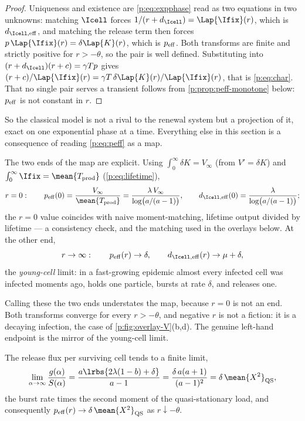 \begin{proof}
Uniqueness and existence are \cref{p:eq:expphase} read as two equations in
two unknowns: matching $\Icell$ forces
$1/(r+d_{\Icell})=\Lap{\Ifix}(r)$, which is $d_{\Icell,{\rm eff}}$, and
matching the release term then forces
$p\,\Lap{\Ifix}(r)=\delta\Lap{K}(r)$, which is $p_{\rm eff}$. Both
transforms are finite and strictly positive for $r>-\theta$, so the pair is
well defined. Substituting into $(r+d_{\Icell})(r+c)=\gamma Tp$ gives
$(r+c)/\Lap{\Ifix}(r)=\gamma T\,\delta\Lap{K}(r)/\Lap{\Ifix}(r)$, that is
\cref{p:eq:char}. That no single pair serves a transient follows from
\cref{p:prop:peff-monotone} below: $p_{\rm eff}$ is not constant in $r$.
\end{proof}

\noindent
So the classical model is not a rival to the renewal system but a projection
of it, exact on one exponential phase at a time. Everything else in this
section is a consequence of reading \cref{p:eq:peff} as a map.

The two ends of the map are explicit. Using $\int_0^\infty\delta K=V_\infty$ (from $V'=\delta K$) and
$\int_0^\infty\Ifix=\mean{T_{\rm prod}}$ (\cref{p:eq:lifetime}),
\begin{equation}
r=0:\qquad
p_{\rm eff}(0)=\frac{V_\infty}{\mean{T_{\rm prod}}}
=\frac{\lambda\,V_\infty}{\log\bigl(a/(a-1)\bigr)},
\qquad
d_{\Icell,{\rm eff}}(0)=\frac{\lambda}{\log\bigl(a/(a-1)\bigr)};
\label{p:eq:peff0}
\end{equation}
the $r=0$ value coincides with naive moment-matching, lifetime output
divided by lifetime --- a consistency check, and the matching used in the
overlays below. At the other end,
\begin{equation}
r\to\infty:\qquad
p_{\rm eff}(r)\to\delta,
\qquad
d_{\Icell,{\rm eff}}(r)\to\mu+\delta,
\label{p:eq:peffinf}
\end{equation}
the \emph{young-cell} limit: in a fast-growing epidemic almost every
infected cell was infected moments ago, holds one particle, bursts at rate
$\delta$, and releases one.

Calling these the two ends understates the map, because $r=0$ is not an end.
Both transforms converge for every $r>-\theta$, and negative $r$ is not a
fiction: it is a decaying infection, the case of
\cref{p:fig:overlay-V}(b,d). The genuine left-hand endpoint is the mirror of
the young-cell limit.

\begin{proposition}
\label{p:prop:oldcell}
The release flux per surviving cell tends to a finite limit,
\begin{equation}
\lim_{\alpha\to\infty}\frac{g(\alpha)}{S(\alpha)}
=\frac{a\lrbs{2\lambda(1-b)+\delta}}{a-1}
=\frac{\delta\,a(a+1)}{(a-1)^2}
=\delta\,\mean{X^2}_{\rm QS},
\label{p:eq:oldcell}
\end{equation}
the burst rate times the second moment of the quasi-stationary load, and
consequently $p_{\rm eff}(r)\to\delta\,\mean{X^2}_{\rm QS}$ as
$r\downarrow-\theta$.
\end{proposition}

